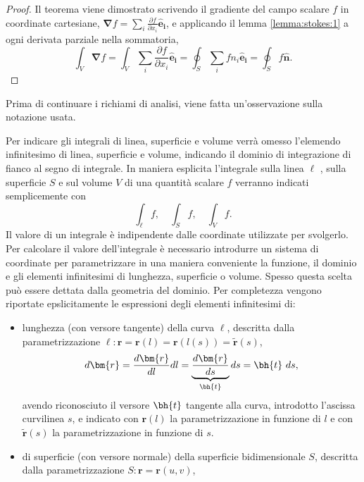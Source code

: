 \begin{proof}
Il teorema viene dimostrato scrivendo il gradiente del campo scalare $f$ in coordinate cartesiane, $\bm{\nabla} f = \sum_i \frac{\partial f}{\partial x_i} \bm{\hat{e}_i}$, e applicando il lemma \ref{lemma:stokes:1} a ogni derivata parziale nella sommatoria,
\begin{equation}
\int_V \bm{\nabla} f = 
  \int_V \sum_i \frac{\partial f}{\partial x_i} \bm{\hat{e}_i} =
   \oint_S \sum_i f n_i \bm{\hat{e}_i} = \oint_S f \bm{\hat{n}} .
\end{equation}
\end{proof}
%
Prima di continuare i richiami di analisi, viene fatta un'osservazione sulla notazione usata.
\begin{remark}
 Per indicare gli integrali di linea, superficie e volume verrà omesso l'elemendo infinitesimo di linea, superficie e volume, indicando il dominio di integrazione di fianco al segno di integrale. In maniera esplicita l'integrale sulla linea $\ell$ , sulla superficie $S$ e sul volume $V$ di una quantità scalare $f$ verranno indicati semplicemente con
 \begin{equation}
  \int_{\ell} f , \quad \int_S f , \quad \int_V f .
 \end{equation}
 Il valore di un integrale è indipendente dalle coordinate utilizzate per svolgerlo. Per calcolare il valore dell'integrale è necessario introdurre un sistema di coordinate per parametrizzare in una maniera conveniente la funzione, il dominio e gli elementi infinitesimi di lunghezza, superficie o volume. Spesso questa scelta può essere dettata dalla geometria del dominio.
Per completezza vengono riportate epslicitamente le espressioni degli elementi infinitesimi di:
\begin{itemize}
\item lunghezza (con versore tangente) della curva $\ell$, descritta dalla parametrizzazione $\ell: \bm{r} = \bm{r}(l) =  \bm{r}(l(s)) = \bm{\tilde{r}}(s)$,
 \begin{equation}
  d \bm{r} = \dfrac{d \bm{r}}{d l} d l = \underbrace{\dfrac{d \bm{r}}{d s}}_{\bh{t}} d s = \bh{t} \ ds ,
 \end{equation}
 avendo riconosciuto il versore $\bh{t}$ tangente alla curva, introdotto l'ascissa curvilinea $s$, e indicato con $\bm{r}(l)$ la parametrizzazione in funzione di $l$ e con $\bm{\tilde{r}}(s)$ la parametrizzazione in funzione di $s$.
\item di superficie (con versore normale) della superficie bidimensionale $S$, descritta dalla parametrizzazione $S: \bm{r} = \bm{r}(u,v)$,

\end{itemize}
\end{remark}
